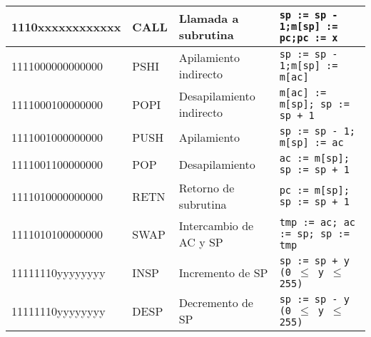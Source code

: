 \begin{table}[ht!]
\begin{tabular}{|l|l|p{3.3cm}|p{5cm}}
\hline
\rowcolor[HTML]{D5E8D4} 1110xxxxxxxxxxxx & CALL  & Llamada a subrutina      & \texttt{sp := sp - 1;m[sp] := pc;pc := x} \\
\hline
\rowcolor[HTML]{D5E8D4} 1111000000000000 & PSHI  & Apilamiento indirecto    & \texttt{sp := sp - 1;m[sp] := m[ac]} \\
\hline
\rowcolor[HTML]{D5E8D4} 1111000100000000 & POPI  & Desapilamiento indirecto & \texttt{m[ac] := m[sp]; sp := sp + 1} \\
\hline
\rowcolor[HTML]{D5E8D4} 1111001000000000 & PUSH  & Apilamiento              & \texttt{sp := sp - 1; m[sp] := ac} \\
\hline
\rowcolor[HTML]{D5E8D4} 1111001100000000 & POP   & Desapilamiento           & \texttt{ac := m[sp]; sp := sp + 1} \\
\hline
\rowcolor[HTML]{D5E8D4} 1111010000000000 & RETN  & Retorno de subrutina     & \texttt{pc := m[sp]; sp := sp + 1} \\
\hline
\rowcolor[HTML]{D5E8D4} 1111010100000000 & SWAP  & Intercambio de AC y SP   & \texttt{tmp := ac; ac := sp; sp := tmp} \\
\hline
\rowcolor[HTML]{D5E8D4} 11111110yyyyyyyy & INSP  & Incremento de SP         & \texttt{sp := sp + y (0 $\leq$ y $\leq$255)} \\
\hline
\rowcolor[HTML]{D5E8D4} 11111110yyyyyyyy & DESP  & Decremento de SP         & \texttt{sp := sp - y (0 $\leq$ y $\leq$255)} \\
\hline
\end{tabular}
\end{table}
